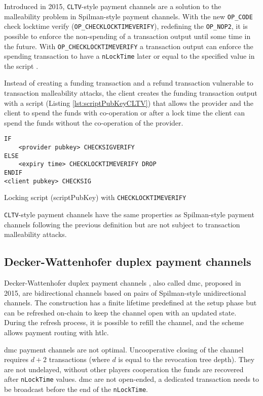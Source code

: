 Introduced in 2015, \texttt{CLTV}-style payment channels are a solution to the malleability
problem in Spilman-style payment channels. With the new \texttt{OP\_CODE} check
locktime verify (\texttt{OP\_CHECKLOCKTIMEVERIFY}), redefining the
\texttt{OP\_NOP2}, it is possible to enforce the non-spending of a transaction
output until some time in the future. With \texttt{OP\_CHECKLOCKTIMEVERIFY} a
transaction output can enforce the spending transaction to have a
\texttt{nLockTime} later or equal to the specified value in the script
\cite{BIP65}.

Instead of creating a funding transaction and a refund transaction vulnerable to
transaction malleability attacks, the client creates the funding transaction
output with a script (Listing \ref{lst:scriptPubKeyCLTV}) that allows the
provider and the client to spend the funds
with co-operation or after a lock time the client can spend the funds without
the co-operation of the provider.

\begin{listing}
  \begin{verbatim}
IF
    <provider pubkey> CHECKSIGVERIFY
ELSE
    <expiry time> CHECKLOCKTIMEVERIFY DROP
ENDIF
<client pubkey> CHECKSIG
  \end{verbatim}
	\caption{Locking script (scriptPubKey) with \texttt{CHECKLOCKTIMEVERIFY}}
	\label{lst:scriptPubKeyCLTV}
\end{listing}

\texttt{CLTV}-style payment channels have the same properties as Spilman-style payment
channels following the previous definition but are not subject to transaction
malleability attacks.


\subsection{Decker-Wattenhofer duplex payment channels}

Decker-Wattenhofer duplex payment channels \cite{Decker2015fast}, also called
\gls{dmc}, proposed in 2015, are bidirectional channels based on pairs of
Spilman-style unidirectional channels. The construction has a finite lifetime
predefined at the setup phase but can be refreshed on-chain to keep the channel
open with an updated state. During the refresh process, it is possible to refill
the channel, and the scheme allows payment routing with \gls{htlc}.

\gls{dmc} payment channels are not optimal. Uncooperative closing of the channel
requires $d + 2$ transactions (where $d$ is equal to the revocation tree depth).
They are not undelayed, without other players cooperation the funds are
recovered after \texttt{nLockTime} values. \gls{dmc} are not open-ended, a
dedicated transaction needs to be broadcast before the end of the
\texttt{nLockTime}.

